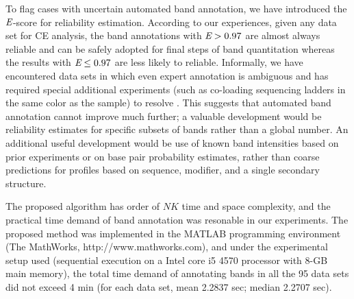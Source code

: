 To flag cases with uncertain automated band annotation, we have introduced the ${\emph{E}}$-score for reliability estimation. According to our experiences, given any data set for CE analysis, the band annotations with ${\emph{E}} > 0.97$ are almost always reliable and can be safely adopted for final steps of band quantitation whereas the results with ${\emph{E}} \le 0.97$ are less likely to reliable. Informally, we have encountered data sets in which even expert annotation is ambiguous and has required special additional experiments (such as co-loading sequencing ladders in the same color as the sample) to resolve \citep{tian2014nature}. This suggests that automated band annotation cannot improve much further; a valuable development would be reliability estimates for specific subsets of bands rather than a global number. An additional useful development would be use of known band intensities based on prior experiments or on base pair probability estimates, rather than coarse predictions for profiles based on sequence, modifier, and a single secondary structure.

The proposed algorithm has order of $NK$ time and space complexity, and the practical time demand of band annotation was resonable in our experiments. The proposed method was implemented in the MATLAB programming environment (The MathWorks, http://www.mathworks.com), and under the experimental setup used (sequential execution on a Intel core i5 4570 processor with 8-GB main memory), the total time demand of annotating bands in all the 95 data sets did not exceed 4 min (for each data set, mean 2.2837 sec; median 2.2707 sec).

